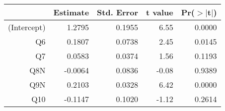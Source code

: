 \begin{table}[ht]
\centering
\begin{tabular}{rrrrr}
  \hline
 & Estimate & Std. Error & t value & Pr($>$$|$t$|$) \\ 
  \hline
(Intercept) & 1.2795 & 0.1955 & 6.55 & 0.0000 \\ 
  Q6 & 0.1807 & 0.0738 & 2.45 & 0.0145 \\ 
  Q7 & 0.0583 & 0.0374 & 1.56 & 0.1193 \\ 
  Q8N & -0.0064 & 0.0836 & -0.08 & 0.9389 \\ 
  Q9N & 0.2103 & 0.0328 & 6.42 & 0.0000 \\ 
  Q10 & -0.1147 & 0.1020 & -1.12 & 0.2614 \\ 
   \hline
\end{tabular}
\end{table}
